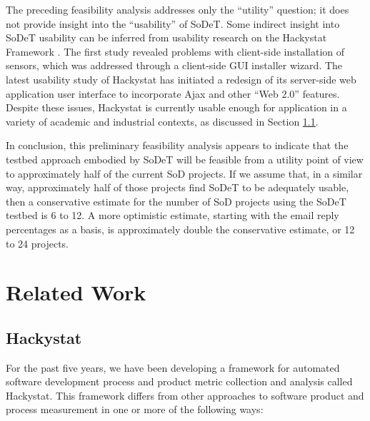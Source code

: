 The preceding feasibility analysis addresses only the ``utility'' question;
it does not provide insight into the ``usability'' of SoDeT.  Some
indirect insight into SoDeT usability can be inferred from usability
research on the Hackystat Framework \cite{csdl2-03-12,csdl2-07-02}.  The
first study revealed problems with client-side installation of sensors,
which was addressed through a client-side GUI installer wizard.  The latest
usability study of Hackystat has initiated a redesign of its server-side
web application user interface to incorporate Ajax and other ``Web 2.0''
features.  Despite these issues, Hackystat is currently usable enough for
application in a variety of academic and industrial contexts, as discussed
in Section \ref{sec:hackystat}.

In conclusion, this preliminary feasibility analysis appears to indicate
that the testbed approach embodied by SoDeT will be feasible from a utility
point of view to approximately half of the current SoD projects.  If we
assume that, in a similar way, approximately half of those projects find
SoDeT to be adequately usable, then a conservative estimate for the number
of SoD projects using the SoDeT testbed is 6 to 12.  A more optimistic estimate,
starting with the email reply percentages as a basis, is approximately double
the conservative estimate, or 12 to 24 projects.

\section{Related Work}

\subsection{Hackystat}
\label{sec:hackystat}


For the past five years, we have been developing a framework for
automated software development process and product metric collection and
analysis called Hackystat.  This framework differs from other approaches to
software product and process measurement in one or more of the following ways:

